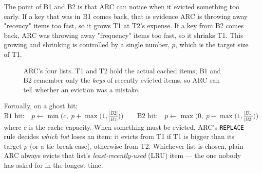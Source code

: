 \documentclass[10pt,a4paper]{article}
\newcommand{\code}[1]{\texttt{#1}}
\begin{document}
The point of B1 and B2 is that ARC can notice when it evicted something too early. If a key that was in
B1 comes back, that is evidence ARC is throwing away "recency" items too fast, so it grows T1 at T2's
expense. If a key from B2 comes back, ARC was throwing away "frequency" items too fast, so it shrinks T1.
This growing and shrinking is controlled by a single number, $p$, which is the target size of T1.

\begin{figure}[H]
\centering
{}
\caption{ARC's four lists. T1 and T2 hold the actual cached items; B1 and B2 remember only the \emph{keys}
of recently evicted items, so ARC can tell whether an eviction was a mistake.}
\end{figure}

Formally, on a ghost hit:
\[
\text{B1 hit:}\quad p \leftarrow \min\!\Big(c,\; p + \max\!\big(1, \tfrac{|B2|}{|B1|}\big)\Big)
\qquad
\text{B2 hit:}\quad p \leftarrow \max\!\Big(0,\; p - \max\!\big(1, \tfrac{|B1|}{|B2|}\big)\Big)
\]
where $c$ is the cache capacity. When something must be evicted, ARC's \code{REPLACE} rule decides
\emph{which list} loses an item: it evicts from T1 if T1 is bigger than its target $p$ (or a tie-break
case), otherwise from T2. Whichever list is chosen, plain ARC always evicts that list's
\emph{least-recently-used} (LRU) item — the one nobody has asked for in the longest time.
\end{document}
